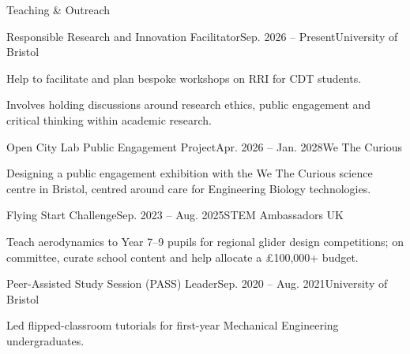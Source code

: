 
\begin{rSection}{Teaching \& Outreach}

    \begin{rSubsection}{Responsible Research and Innovation Facilitator}{Sep. 2026 -- Present}{University of Bristol}{}
        \item Help to facilitate and plan bespoke workshops on RRI for CDT students.
        \item Involves holding discussions around research ethics, public engagement and critical thinking within academic research.
    \end{rSubsection}

    \begin{rSubsection}{Open City Lab Public Engagement Project}{Apr. 2026 -- Jan. 2028}{We The Curious}{}
        \item Designing a public engagement exhibition with the We The Curious science centre in Bristol, centred around care for Engineering Biology technologies.
    \end{rSubsection}
    
    \begin{rSubsection}{Flying Start Challenge}{Sep. 2023 -- Aug. 2025}{STEM Ambassadors UK}{}
        \item Teach aerodynamics to Year 7--9 pupils for regional glider design competitions; on committee, curate school content and help allocate a £100,000+ budget.
    \end{rSubsection}

    \begin{rSubsection}{Peer-Assisted Study Session (PASS) Leader}{Sep. 2020 -- Aug. 2021}{University of Bristol}{}
        \item Led flipped-classroom tutorials for first-year Mechanical Engineering undergraduates.
    \end{rSubsection}

\end{rSection}
